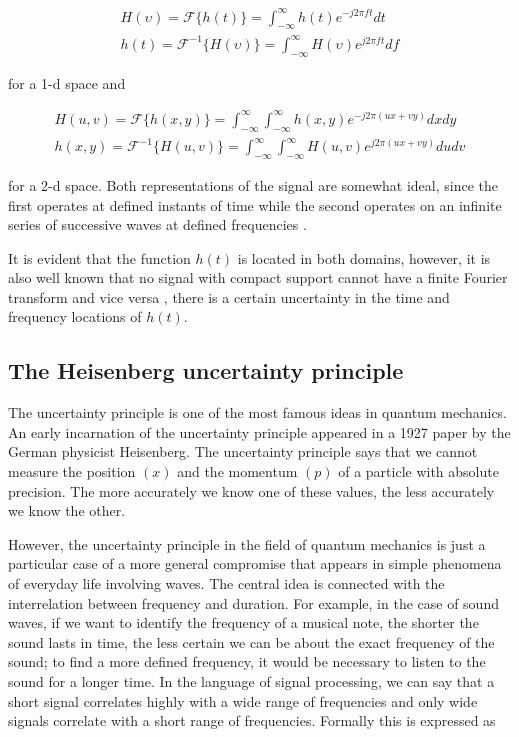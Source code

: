 \begin{equation}\label{eq:fourier_transforms_1d}
    \begin{gathered}
        H(\upsilon) = \mathcal{F}\{h(t)\} = \int_{-\infty}^{\infty} h(t) e^{-j2\pi f t} dt \\
        h(t) = \mathcal{F}^{-1}\{H(\upsilon)\} = \int_{-\infty}^{\infty} H(\upsilon) e^{j2\pi f t} df 
    \end{gathered}
\end{equation}

for a 1-d space and 

\begin{equation}\label{eq:fourier_transforms_2d}
    \begin{gathered}
        H(u, v) = \mathcal{F}\{h(x, y)\} = \int_{-\infty}^{\infty} \int_{-\infty}^{\infty} h(x, y) e^{-j2\pi (ux + vy)} dx dy \\
        h(x, y) = \mathcal{F}^{-1}\{H(u, v)\} = \int_{-\infty}^{\infty} \int_{-\infty}^{\infty}  H(u, v) e^{j2\pi (ux + vy)} du dv 
    \end{gathered}
\end{equation}

for a 2-d space. Both representations of the signal are somewhat ideal, since the first operates at defined instants of time while the second operates on an infinite series of successive waves at defined frequencies \cite{Gabor:JIEE:1946a}. 

It is evident that the function $h(t)$ is located in both domains, however, it is also well known that no signal with compact support cannot have a finite Fourier transform and vice versa \cite{Bracewell:FourierBook:1999}, there is a certain uncertainty in the time and frequency locations of $h(t)$.

\subsection{The Heisenberg uncertainty principle }

The uncertainty principle is one of the most famous ideas in quantum mechanics. An early incarnation of the uncertainty principle appeared in a 1927 paper by the German physicist Heisenberg. The uncertainty principle says that we cannot measure the position $(x)$ and the momentum $(p)$ of a particle with absolute precision. The more accurately we know one of these values, the less accurately we know the other. 

However, the uncertainty principle in the field of quantum mechanics is just a particular case of a more general compromise that appears in simple phenomena of everyday life involving waves. The central idea is connected with the interrelation between frequency and duration. For example, in the case of sound waves, if we want to identify the frequency of a musical note, the shorter the sound lasts in time, the less certain we can be about the exact frequency of the sound; to find a more defined frequency, it would be necessary to listen to the sound for a longer time. In the language of signal processing, we can say that a short signal correlates highly with a wide range of frequencies and only wide signals correlate with a short range of frequencies. Formally this is expressed as

